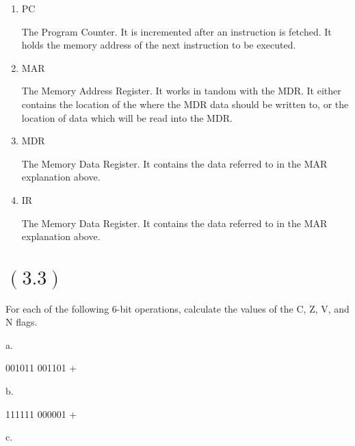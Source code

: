 \documentclass[letterpaper,12pt,titlepage]{article}
\begin{document}
\renewcommand{\labelenumi}{\alph{enumi})}
\begin{enumerate}
\item PC

\begin{mdframed}[style=MyFrame]

The Program Counter. It is incremented after an instruction is fetched. It holds the memory address of the next instruction to be executed.

\end{mdframed}

\item MAR

\begin{mdframed}[style=MyFrame]

The Memory Address Register. It works in tandom with the MDR. It either contains the location of the where the MDR data should be written to, or the location of data which will be read into the MDR.

\end{mdframed}

\item MDR 

\begin{mdframed}[style=MyFrame]

The Memory Data Register. It contains the data referred to in the MAR explanation above.

\end{mdframed}

\item IR

\begin{mdframed}[style=MyFrame]

The Memory Data Register. It contains the data referred to in the MAR explanation above.

\end{mdframed}

\end{enumerate}

\section*{$(3.3)$} For each of the following 6-bit operations, calculate the values of the C, Z, V, and N flags.

a.

001011
001101
+

b. 

111111
000001
+

c.
\end{document}
